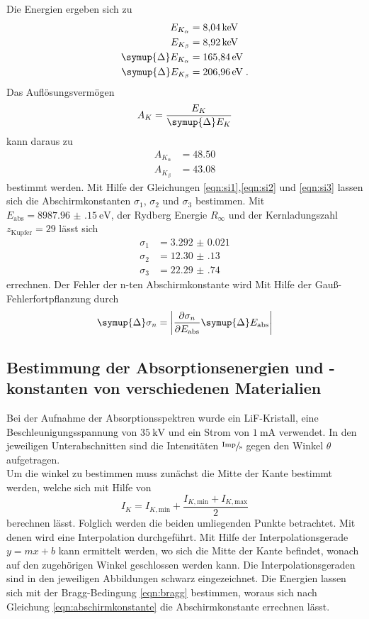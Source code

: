 Die Energien ergeben sich zu 
\begin{align*}
    E_{K_\alpha} & =  \SI{8.04}{\kilo\electronvolt} \\
    E_{K_\beta}  & =  \SI{8.92}{\kilo\electronvolt} \\
    \symup{\Delta}E_{K_\alpha} &= \SI{165.84}{\electronvolt} \\
    \symup{\Delta}E_{K_\beta}  &= \SI{206.96}{\electronvolt} \; \text{.}
\end{align*}
Das Auflösungsvermögen 
\begin{equation}
    A_K = \frac{E_K}{\symup{\Delta}E_K}
\end{equation}
kann daraus zu 
\begin{align*}
    A_{K_\alpha}&= \num{48.50} \\
    A_{K_\beta} &= \num{43.08}
\end{align*}
bestimmt werden.
Mit Hilfe der Gleichungen \eqref{eqn:si1},\eqref{eqn:si2} und \eqref{eqn:si3} lassen sich die Abschirmkonstanten $\sigma_1$, $\sigma_2$ und $\sigma_3$ bestimmen.
Mit $E_\text{abs} = \SI{8987.96(15)}{\electronvolt}$\cite{eabs}, der Rydberg Energie $R_\infty$ und der Kernladungszahl
$z_\text{Kupfer} = 29 $ lässt sich
\begin{align*}
    \sigma_1 &= \num{3.292(21)}  \\
    \sigma_2 &= \num{12.30(13)}  \\
    \sigma_3 &= \num{22.29(74)}
\end{align*}
errechnen.
Der Fehler der n-ten Abschirmkonstante wird Mit Hilfe der Gauß-Fehlerfortpflanzung durch
\begin{equation}
    \symup{\Delta} \sigma_n = \left | \frac{\partial \sigma_n}{\partial E_\text{abs} } \symup{\Delta} E_\text{abs} \right | 
\end{equation} 
\subsection{Bestimmung der Absorptionsenergien und -konstanten von verschiedenen Materialien}
Bei der Aufnahme der Absorptionsspektren wurde ein LiF-Kristall, eine Beschleunigungsspannung von $\SI{35}{\kilo\volt}$ und ein Strom von $\SI{1}{\milli\ampere}$
verwendet. 
In den jeweiligen Unterabschnitten sind die Intensitäten $\sfrac{\text{Imp}}{\si{\second}}$ gegen den Winkel $\theta$ aufgetragen. \\
Um die winkel zu bestimmen muss zunächst die Mitte der Kante bestimmt werden, welche sich mit Hilfe von
\begin{equation}
    I_K = I_{K, \text{min}} + \frac{I_{K, \text{min}} + I_{K, \text{max}}}{2}
\end{equation}
berechnen lässt. 
Folglich werden die beiden umliegenden Punkte betrachtet. 
Mit denen wird eine Interpolation durchgeführt. 
Mit Hilfe der Interpolationsgerade $y = mx+b$ kann ermittelt werden, wo sich die Mitte der Kante befindet, wonach auf den zugehörigen Winkel 
geschlossen werden kann.
Die Interpolationsgeraden sind in den jeweiligen Abbildungen schwarz eingezeichnet. 
Die Energien lassen sich mit der Bragg-Bedingung \ref{eqn:bragg} bestimmen, woraus sich nach Gleichung \eqref{eqn:abschirmkonstante} 
die Abschirmkonstante errechnen lässt.
